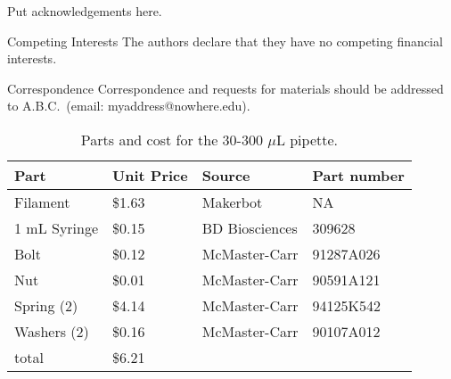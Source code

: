\documentclass{nature}
\begin{document}







\begin{addendum}
 \item Put acknowledgements here.
 \item[Competing Interests] The authors declare that they have no
competing financial interests.
 \item[Correspondence] Correspondence and requests for materials
should be addressed to A.B.C.~(email: myaddress@nowhere.edu).
\end{addendum}

\begin{table}
\centering
\caption{Parts and cost for the 30-300 $\mu$L pipette.}
\label{table1}
\medskip
\begin{tabular}{|l|l|l|l|}
\hline
Part         & Unit Price & Source         & Part number \\ \hline
Filament     & \$1.63     & Makerbot       & NA          \\ \hline
1 mL Syringe & \$0.15     & BD Biosciences & 309628      \\ \hline
Bolt         & \$0.12     & McMaster-Carr  & 91287A026   \\ \hline
Nut          & \$0.01     & McMaster-Carr  & 90591A121   \\ \hline
Spring (2)   & \$4.14     & McMaster-Carr  & 94125K542   \\ \hline
Washers (2)  & \$0.16     & McMaster-Carr  & 90107A012   \\ \hline
total        & \$6.21     &                &             \\ \hline
\end{tabular}
\end{table}
\end{document}
